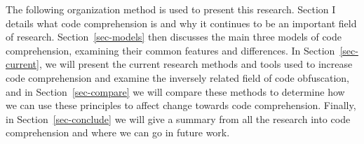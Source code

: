 The following organization method is used to present this research. Section I  
details what code 
comprehension is and why it continues to
be an important field of research. Section~\ref{sec-models} then 
discusses the main three models of code
comprehension, examining their 
common features and differences.  In Section~\ref{sec-current}, 
we will present the
current research methods and tools used to increase code 
comprehension and examine the inversely related field of code obfuscation, and in Section~\ref{sec-compare} we will compare
these methods to determine 
how we can use these principles to affect change towards code 
comprehension. Finally, in Section~\ref{sec-conclude} we will give 
a summary from all the research into code comprehension and where we can go
in future work.